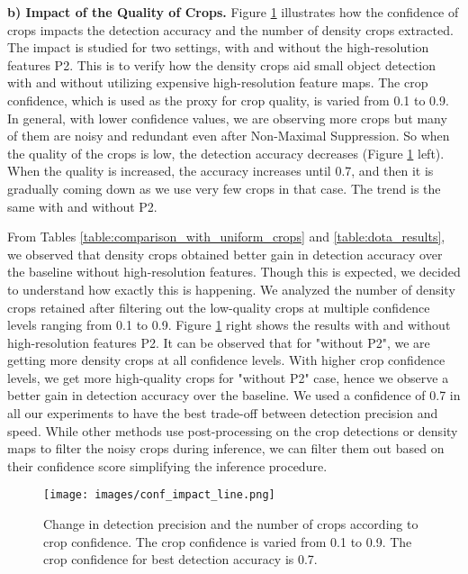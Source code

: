 \noindent \textbf{b) Impact of the Quality of Crops.}  
Figure \ref{fig:conf_impact} illustrates how the confidence of crops impacts the detection accuracy and the number of density crops extracted. The impact is studied for two settings, with and without the high-resolution features P2. This is to verify how the density crops aid small object detection with and without utilizing expensive high-resolution feature maps. The crop confidence, which is used as the proxy for crop quality,  is varied from 0.1 to 0.9. In general, with lower confidence values, we are observing more crops but many of them are noisy and redundant even after Non-Maximal Suppression. So when the quality of the crops is low, the detection accuracy decreases (Figure \ref{fig:conf_impact} left). When the quality is increased, the accuracy increases until 0.7, and then it is gradually coming down as we use very few crops in that case. The trend is the same with and without P2.

From Tables \ref{table:comparison_with_uniform_crops} and \ref{table:dota_results}, we observed that density crops obtained better gain in detection accuracy over the baseline without high-resolution features. Though this is expected, we decided to understand how exactly this is happening. We analyzed the number of density crops retained after filtering out the low-quality crops at multiple confidence levels ranging from 0.1 to 0.9. Figure \ref{fig:conf_impact} right shows the results with and without high-resolution features P2. It can be observed that for "without P2", we are getting more density crops at all confidence levels. With higher crop confidence levels, we get more high-quality crops for "without P2" case, hence we observe a better gain in detection accuracy over the baseline. We used a confidence of 0.7 in all our experiments to have the best trade-off between detection precision and speed. While other methods use post-processing on the crop detections \cite{clusnet-Yang-2019} or density maps \cite{dmap-Li-2020} to filter the noisy crops during inference, we can filter them out based on their confidence score simplifying the inference procedure.
\begin{figure}[h!]
  \centering
  \texttt{[image: images/conf\_impact\_line.png]} 
  \caption{Change in detection precision and the number of crops according to crop confidence. The crop confidence is varied from 0.1 to 0.9. The crop confidence for best detection accuracy is 0.7.}
  \label{fig:conf_impact}
\end{figure}

